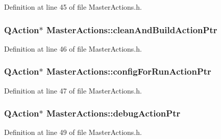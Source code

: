 Definition at line 45 of file Master\-Actions.\-h.

\hypertarget{class_master_actions_a2c0f332975bec2424d4af212ab566c5a}{
\subsubsection[{clean\-And\-Build\-Action\-Ptr}]{\setlength{\rightskip}{0pt plus 5cm}Q\-Action$\ast$ Master\-Actions\-::clean\-And\-Build\-Action\-Ptr\hspace{0.3cm}{\ttfamily [private]}}}\label{class_master_actions_a2c0f332975bec2424d4af212ab566c5a}


Definition at line 46 of file Master\-Actions.\-h.

\hypertarget{class_master_actions_acd6548d1110ae426f384bfeb6acc9c1f}{
\subsubsection[{config\-For\-Run\-Action\-Ptr}]{\setlength{\rightskip}{0pt plus 5cm}Q\-Action$\ast$ Master\-Actions\-::config\-For\-Run\-Action\-Ptr\hspace{0.3cm}{\ttfamily [private]}}}\label{class_master_actions_acd6548d1110ae426f384bfeb6acc9c1f}


Definition at line 47 of file Master\-Actions.\-h.

\hypertarget{class_master_actions_ae37993bbbed4a238ea3b11089ac46a61}{
\subsubsection[{debug\-Action\-Ptr}]{\setlength{\rightskip}{0pt plus 5cm}Q\-Action$\ast$ Master\-Actions\-::debug\-Action\-Ptr\hspace{0.3cm}{\ttfamily [private]}}}\label{class_master_actions_ae37993bbbed4a238ea3b11089ac46a61}


Definition at line 49 of file Master\-Actions.\-h.


